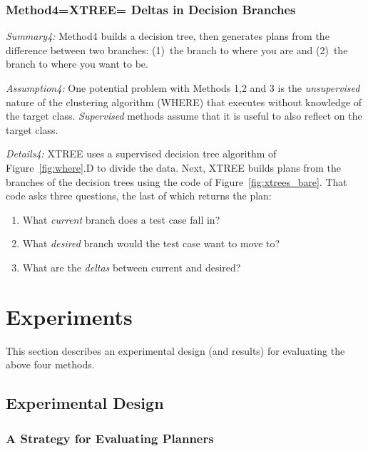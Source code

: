 \documentclass{sig-alternate}
\newcommand{\be}{\begin{enumerate}}
\newcommand{\ee}{\end{enumerate}}
\newcommand{\fig}[1]{Figure~\ref{fig:#1}}
\begin{document}
%




\subsubsection{Method4=XTREE=  Deltas in Decision Branches}

{\em Summary4:} Method4 builds a decision tree,  then generates
plans from the difference between two branches:
(1)~the branch to where you are and (2)~the branch to where you want to be.

{\em Assumption4:} One potential problem with Methods 1,2 and 3 is the {\em unsupervised} nature of
the clustering algorithm (WHERE) that  
executes without knowledge of the target class.  {\em Supervised} methods assume that it is useful to also reflect on the target class.

{\em Details4:} 
XTREE uses a supervised   decision tree algorithm of \fig{where}.D to divide the data.
Next, XTREE builds plans from the branches of the decision trees using the code of \fig{xtrees_bare}.
That code asks three questions, the last of which returns the plan:
\be
\item
What {\em current} branch does a test case fall in?
\item What {\em desired} branch would the test case want to move to?
\item What are the {\em deltas} between current and desired? 
\ee

\section{Experiments}

  
 

This section describes an experimental design (and results) for evaluating the above four methods. 
\subsection{Experimental Design}

\subsubsection{A Strategy for Evaluating Planners}
 
\end{document}
